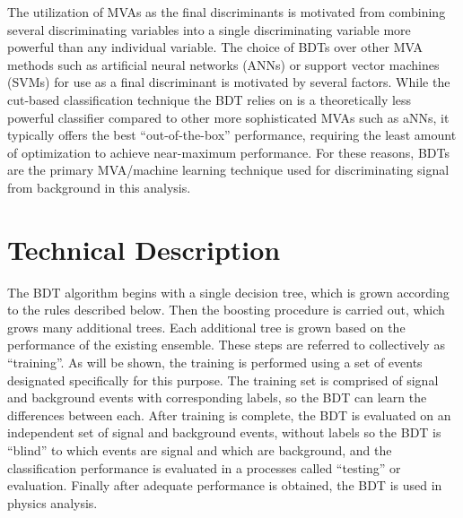 The utilization of MVAs as the final discriminants is motivated from combining several discriminating variables into a single discriminating variable more powerful
than any individual variable.
The choice of BDTs over other MVA methods such as artificial neural networks (ANNs) or support vector machines (SVMs) for use as a final discriminant 
is motivated by several factors. While the cut-based classification technique the BDT relies on is a theoretically less powerful classifier compared
to other more sophisticated MVAs such as aNNs, it typically offers the best ``out-of-the-box'' performance, requiring the least amount
of optimization to achieve near-maximum performance.
For these reasons, BDTs are the primary MVA/machine learning technique used for discriminating signal from background
in this analysis.

\section{Technical Description}
The BDT algorithm begins with a single decision tree, which is grown according to the rules described below. Then the boosting procedure is carried out, which
grows many additional trees. Each additional tree is grown based on the performance of the existing ensemble. These steps are
referred to collectively as ``training''. As will be shown, the training is performed using a set of events designated specifically for this purpose.
The training set is comprised of signal and background events with corresponding labels, so the BDT can learn the differences between each.
After training is complete, the BDT is evaluated on an independent set of signal and background events, without labels so the BDT is ``blind'' to which events are
signal and which are background, and the classification performance is evaluated in a processes called ``testing'' or evaluation. Finally after adequate performance
is obtained, the BDT is used in physics analysis.

